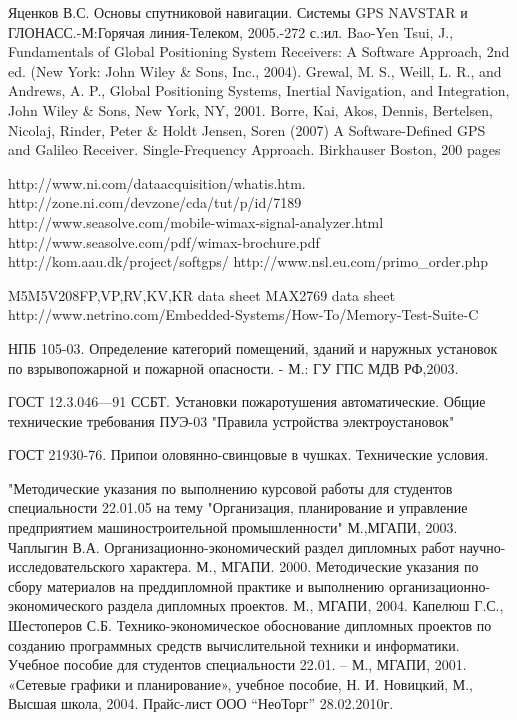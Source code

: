 
\begin{thebibliography}{99}
 Яценков В.С. Основы спутниковой навигации. Системы GPS NAVSTAR и ГЛОНАСС.-М:Горячая линия-Телеком, 2005.-272 с.:ил.
 Bao-Yen Tsui, J., Fundamentals of Global Positioning System Receivers: A Software Approach, 2nd ed. (New York: John Wiley \& Sons, Inc., 2004).
 Grewal, M. S., Weill, L. R., and Andrews, A. P., Global Positioning Systems, Inertial Navigation, and Integration, John Wiley \& Sons, New York, NY, 2001.
 Borre, Kai, Akos, Dennis, Bertelsen, Nicolaj, Rinder, Peter \& Holdt Jensen, Soren (2007) A Software-Defined GPS and Galileo Receiver. Single-Frequency Approach. Birkhauser Boston, 200 pages

 http://www.ni.com/dataacquisition/whatis.htm.
 http://zone.ni.com/devzone/cda/tut/p/id/7189
 http://www.seasolve.com/mobile-wimax-signal-analyzer.html
 http://www.seasolve.com/pdf/wimax-brochure.pdf
 http://kom.aau.dk/project/softgps/
 http://www.nsl.eu.com/primo\_order.php

 M5M5V208FP,VP,RV,KV,KR data sheet
 MAX2769 data sheet
 http://www.netrino.com/Embedded-Systems/How-To/Memory-Test-Suite-C

 НПБ 105-03. Определение категорий помещений, зданий и наружных установок по
взрывопожарной и пожарной опасности. - М.: ГУ ГПС МДВ РФ,2003.

 ГОСТ 12.3.046—91 ССБТ. Установки пожаротушения автоматические. Общие технические требования 
 ПУЭ-03 "Правила устройства электроустановок"

 ГОСТ 21930-76. Припои оловянно-свинцовые в чушках. Технические условия.

 "Методические указания по выполнению курсовой работы для студентов специальности 22.01.05
	на тему "Организация, планирование и управление предприятием машиностроительной промышленности" М.,МГАПИ, 2003.
 Чаплыгин В.А. Организационно-экономический раздел дипломных работ научно-исследовательского характера. М., МГАПИ. 2000.
 Методические указания по сбору материалов на преддипломной практике и выполнению организационно-экономического
	раздела дипломных проектов. М., МГАПИ, 2004.
 Капелюш Г.С., Шестоперов С.Б. Технико-экономическое обоснование дипломных проектов по созданию программных средств
	вычислительной техники и информатики. Учебное пособие для студентов специальности 22.01. – М., МГАПИ, 2001.
 «Сетевые графики и планирование», учебное пособие, Н. И. Новицкий, М., Высшая школа, 2004.
 Прайс-лист ООО “НеоТорг” 28.02.2010г.


\end{thebibliography}
